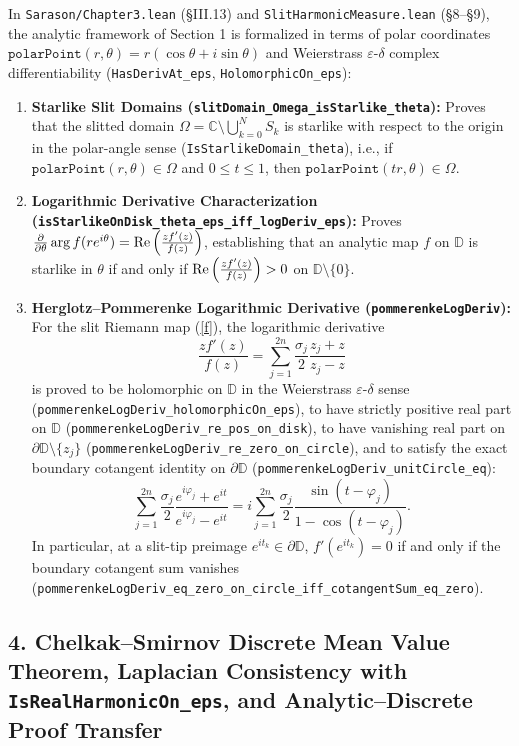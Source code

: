 \documentclass[]{amsart}
\numberwithin{equation}{section}
\renewcommand{\phi}{\varphi}
\newcommand{\D}{\mathbb{D}}
\newcommand{\C}{\mathbb{C}}
\newcommand{\eps}{\varepsilon}
\newcommand{\re}{\mbox{\rm Re\,}}
\begin{document}
In \texttt{Sarason/Chapter3.lean} (\S III.13) and \texttt{SlitHarmonicMeasure.lean} (\S 8--\S 9), the analytic framework of Section 1 is formalized in terms of polar coordinates $\texttt{polarPoint}(r,\theta) = r(\cos\theta + i\sin\theta)$ and Weierstrass $\eps$-$\delta$ complex differentiability (\texttt{HasDerivAt\_eps}, \texttt{HolomorphicOn\_eps}):
\begin{enumerate}
\item \textbf{Starlike Slit Domains (\texttt{slitDomain\_Omega\_isStarlike\_theta}):}
Proves that the slitted domain $\varOmega = \C \setminus \bigcup_{k=0}^N S_k$ is starlike with respect to the origin in the polar-angle sense (\texttt{IsStarlikeDomain\_theta}), i.e., if $\texttt{polarPoint}(r,\theta) \in \varOmega$ and $0 \le t \le 1$, then $\texttt{polarPoint}(tr,\theta) \in \varOmega$.
\item \textbf{Logarithmic Derivative Characterization (\texttt{isStarlikeOnDisk\_theta\_eps\_iff\_logDeriv\_eps}):}
Proves $\frac{\partial}{\partial\theta}\arg f(re^{i\theta}) = \re\!\left(\frac{zf'(z)}{f(z)}\right)$, establishing that an analytic map $f$ on $\D$ is starlike in $\theta$ if and only if $\re\!\left(\frac{zf'(z)}{f(z)}\right) > 0$ on $\D \setminus \{0\}$.
\item \textbf{Herglotz--Pommerenke Logarithmic Derivative (\texttt{pommerenkeLogDeriv}):}
For the slit Riemann map (\ref{f}), the logarithmic derivative
\[
\frac{z f'(z)}{f(z)} = \sum_{j=1}^{2n} \frac{\sigma_j}{2}\frac{z_j + z}{z_j - z}
\]
is proved to be holomorphic on $\D$ in the Weierstrass $\eps$-$\delta$ sense (\texttt{pommerenkeLogDeriv\_holomorphicOn\_eps}), to have strictly positive real part on $\D$ (\texttt{pommerenkeLogDeriv\_re\_pos\_on\_disk}), to have vanishing real part on $\partial\D \setminus \{z_j\}$ (\texttt{pommerenkeLogDeriv\_re\_zero\_on\_circle}), and to satisfy the exact boundary cotangent identity on $\partial\D$ (\texttt{pommerenkeLogDeriv\_unitCircle\_eq}):
\[
\sum_{j=1}^{2n} \frac{\sigma_j}{2}\frac{e^{i\phi_j} + e^{it}}{e^{i\phi_j} - e^{it}}
= i \sum_{j=1}^{2n} \frac{\sigma_j}{2}\frac{\sin(t - \phi_j)}{1 - \cos(t - \phi_j)}.
\]
In particular, at a slit-tip preimage $e^{it_k} \in \partial\D$, $f'(e^{it_k}) = 0$ if and only if the boundary cotangent sum vanishes (\texttt{pommerenkeLogDeriv\_eq\_zero\_on\_circle\_iff\_cotangentSum\_eq\_zero}).
\end{enumerate}

\subsection*{4. Chelkak--Smirnov Discrete Mean Value Theorem, Laplacian Consistency with \texttt{IsRealHarmonicOn\_eps}, and Analytic--Discrete Proof Transfer}
\end{document}

